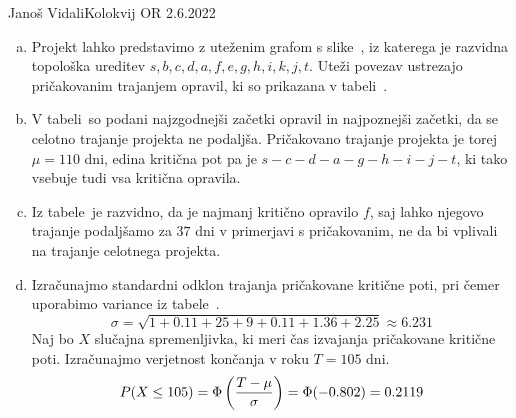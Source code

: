 \begin{naloga}{Janoš Vidali}{Kolokvij OR 2.6.2022}
\begin{odgovor}
\begin{enumerate}[(a)]
\item Projekt lahko predstavimo z uteženim grafom s slike~\fig,
iz katerega je raz\-vid\-na topološka ureditev
$s, b, c, d, a, f, e, g, h, i, k, j, t$.
Uteži povezav ustrezajo pričakovanim trajanjem opravil,
ki so prikazana v tabeli~.

\item V tabeli~
so podani najzgodnejši začetki opravil in najpoznejši začetki,
da se celotno trajanje projekta ne podaljša.
Pričakovano trajanje projekta je torej $\mu = 110$ dni,
edina kritična pot pa je $s - c - d - a - g - h - i - j - t$,
ki tako vsebuje tudi vsa kritična opravila.

\item Iz tabele~ je razvidno,
da je najmanj kritično opravilo $f$,
saj lahko njegovo trajanje
podaljšamo za $37$ dni v primerjavi s pričakovanim,
ne da bi vplivali na trajanje celotnega projekta.

\item Izračunajmo standardni odklon trajanja pričakovane kritične poti,
pri čemer uporabimo variance iz tabele~.
$$
\sigma = \sqrt{1 + 0.11 + 25 + 9 + 0.11 + 1.36 + 2.25} \approx 6.231
$$
Naj bo $X$ slučajna spremenljivka,
ki meri čas izvajanja pričakovane kritične poti.
Izračunajmo verjetnost končanja v roku $T = 105$ dni.
$$
P(X \le 105) = \Phi\left({T - \mu \over \sigma}\right) = \Phi(-0.802) = 0.2119
$$
\end{enumerate}
%
\begin{slika}
\makebox[\textwidth][c]{
\pgfslika
}
\end{slika}
%
\begin{tabela}
\end{tabela}
\end{odgovor}
\end{naloga}
